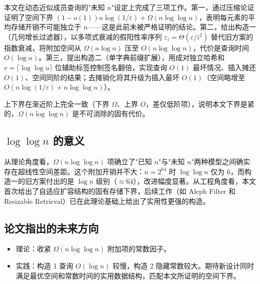 \documentclass[UTF8,11pt,a4paper]{ctexart}
\begin{document}
本文在动态近似成员查询的"未知 $n$"设定上完成了三项工作。第一，通过压缩论证证明了空间下界 $(1-o(1))n\log(1/\varepsilon)+\Omega(n\log\log n)$，表明每元素的平均存储开销不可能独立于 $n$——这是此前未被严格证明的结论。第二，给出构造一（几何增长过滤器），以多项式衰减的假阳性率序列 $\varepsilon_i=\Theta(\varepsilon/i^2)$ 替代旧方案的指数衰减，将附加空间从 $\Omega(n\log n)$ 压至 $O(n\log\log n)$，代价是查询时间 $O(\log n)$。第三，提出构造二（单字典前缀扩展），用成对独立哈希和 $r=\lceil\log\log u\rceil$ 位辅助标签控制签名翻倍，实现查询 $O(1)$ 最坏情况、插入摊还 $O(1)$、空间同阶的结果；去摊销化将其升级为插入最坏 $O(1)$（空间略增至 $O(n\log(1/\varepsilon)+n\log\log n)$）。

上下界在渐近阶上完全一致（下界 $\Omega$、上界 $O$，差仅低阶项），说明本文下界是紧的，$\Omega(n\log\log n)$ 是不可消除的固有代价。

\subsection{$\log\log n$ 的意义}

从理论角度看，$\Omega(n\log\log n)$ 项确立了"已知 $n$"与"未知 $n$"两种模型之间确实存在超线性空间差距。这个附加开销并不大：$n=2^{64}$ 时 $\log\log n$ 仅为 6，而构造一的旧方案付出的是 $\log n$ 级别（$\approx 64$），改进幅度显著。从工程角度看，本文首次给出了自适应扩容结构的固有存储下界，后续工作（如 Aleph Filter 和 Resizable Retrieval）已在此理论基础上给出了实用性更强的构造。

\subsection{论文指出的未来方向}

\begin{itemize}
    \item 理论：收紧 $\Omega(n\log\log n)$ 附加项的常数因子。
    \item 实践：构造 1 查询 $O(\log n)$ 较慢，构造 2 隐藏常数较大。期待新设计同时满足最优空间和常数时间的实用数据结构，匹配本文所证明的空间下界。
\end{itemize}
\end{document}

